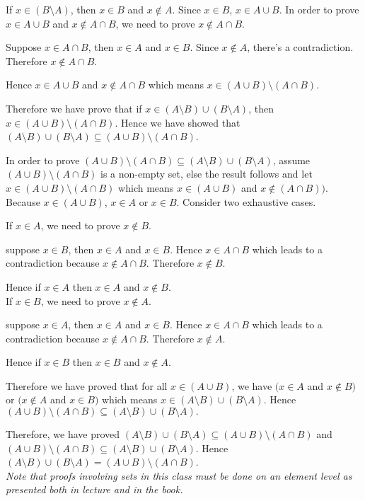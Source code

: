 \documentclass[11pt]{article}
\begin{document}
\begin{enumerate}
\begin{addmargin}[2em]{0em}
\begin{addmargin}[2em]{0em}
		If $x \in (B \setminus A)$, then $x \in B$ and $x \notin A$. Since $x \in B$, $x \in A \cup B$. In order to prove $x \in A \cup B$ and $x \notin A \cap B$, we need to prove $x \notin A \cap B$.
		\begin{addmargin}[2em]{0em}
			Suppose $x \in A \cap B$, then $x \in A$ and $x \in B$. Since $x \notin A$, there's a contradiction. Therefore $x \notin A \cap B$.
		\end{addmargin}
		Hence $x \in A \cup B$ and $x \notin A \cap B$ which means $x \in (A \cup B) \setminus (A \cap B)$. 
	\end{addmargin}
	Therefore we have prove that if $x \in (A \setminus B) \cup (B \setminus A)$, then $x \in (A \cup B) \setminus (A \cap B)$. Hence we have showed that $(A \setminus B) \cup (B \setminus A) \subseteq (A \cup B) \setminus (A \cap B)$.
\end{addmargin}
\bigskip
	\begin{addmargin}[2em]{0em}
			In order to prove $(A \cup B) \setminus (A \cap B) \subseteq (A \setminus B) \cup (B \setminus A) $, assume $(A \cup B) \setminus (A \cap B)$ is a non-empty set, else the result follows and let $x \in (A \cup B) \setminus (A \cap B)$ which means $x \in (A \cup B)$ and $x \notin (A \cap B))$. Because $x \in (A \cup B)$, $x \in A$ or $x \in B$. Consider two exhaustive cases.
				\begin{addmargin}[2em]{0em}
				If $x \in A$, we need to prove $x \notin B$. 
				\begin{addmargin}[2em]{0em}
					suppose $x \in B$, then $x \in A$ and $x \in B$. Hence $x \in A \cap B$ which leads to a contradiction because $x \notin A \cap B$. Therefore $x \notin B$.
				\end{addmargin}
			Hence if $x \in A$ then $x \in A$ and $x \notin B$.\\
			If $x \in B$, we need to prove $x \notin A$. 
			\begin{addmargin}[2em]{0em}
				suppose $x \in A$, then $x \in A$ and $x \in B$. Hence $x \in A \cap B$ which leads to a contradiction because $x \notin A \cap B$. Therefore $x \notin A$.
			\end{addmargin}
			Hence if $x \in B$ then $x \in B$ and $x \notin A$.
			\end{addmargin}
		Therefore we have proved that for all $x \in (A \cup B)$, we have $(x \in A$ and $x \notin B)$ or  $(x \notin A$ and $x \in B)$ which means $x \in (A \setminus B) \cup (B \setminus A)$. Hence $(A \cup B) \setminus (A \cap B) \subseteq (A \setminus B) \cup (B \setminus A).$
\end{addmargin}
Therefore, we have proved  $(A \setminus B) \cup (B \setminus A) \subseteq (A \cup B) \setminus (A \cap B)$ and  $(A \cup B) \setminus (A \cap B) \subseteq (A \setminus B) \cup (B \setminus A).$ Hence $(A \setminus B) \cup (B \setminus A) = (A \cup B) \setminus (A \cap B)$.\\

{\em Note that proofs involving sets in this class must be done on an element level as presented both in lecture and in the book.}

\end{enumerate}
\end{document}
